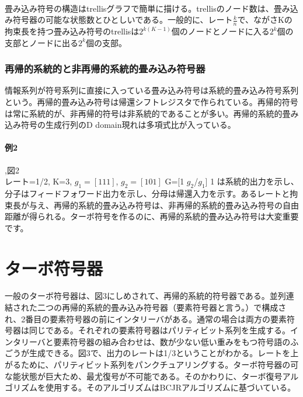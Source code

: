 \documentclass[20 pts]{article}
\begin{document}
\paragraph{}
畳み込み符号の構造はtrellisグラフで簡単に描ける。trellisのノード数は、畳み込み符号器の可能な状態数とひとしいである。一般的に、レート$\frac{k}{n}$で、ながさKの拘束長を持つ畳み込み符号のtrellisは$2^{k(K-1)}$個のノードとノードに入る$2^k$個の支部とノードに出る$2^k$個の支部。
\subsubsection{再帰的系統的と非再帰的系統的畳み込み符号器}
情報系列が符号系列に直接に入っている畳み込み符号は系統的畳み込み符号系列という。再帰的畳み込み符号は帰還シフトレジスタで作られている。再帰的符号は常に系統的が、非再帰的符号は非系統的であることが多い。再帰的系統的畳み込み符号の生成行列のD domain現れは多項式比が入っている。
\paragraph{例2},図2\\
レート=1/2, K=3, $g_1=[1 1 1]$, $g_2=[1 0 1]$\newline
G=[1 $g_2$/$g_1$]
1 は系統的出力を示し、分子はフィードフォワード出力を示し、分母は帰還入力を示す。あるレートと拘束長が与え、再帰的系統的畳み込み符号は、非再帰的系統的畳み込み符号の自由距離が得られる。ターボ符号を作るのに、再帰的系統的畳み込み符号は大変重要です。
\section{ターボ符号器}
一般のターボ符号器は、図3にしめされて、再帰的系統的符号器である。並列連結された二つの再帰的系統的畳み込み符号器（要素符号器と言う。）で構成され、2番目の要素符号器の前にインタリーバがある。通常の場合は両方の要素符号器は同じである。それぞれの要素符号器はパリティビット系列を生成する。インタリーバと要素符号器の組み合わせは、数が少ない低い重みをもつ符号語のふごうが生成できる。図3で、出力のレートは1/3ということがわかる。レートを上がるために、パリティビット系列をパンクチュアリングする。ターボ符号器の可な能状態が巨大ため、最尤復号が不可能である。そのかわりに、ターボ復号アルゴリズムを使用する。そのアルゴリズムはBCJRアルゴリズムに基づいている。
\end{document}
